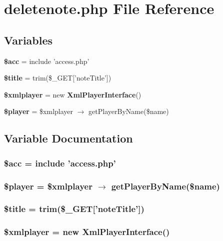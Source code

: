 \section{deletenote.php File Reference}
\label{deletenote_8php}


\subsection*{Variables}
\begin{CompactItemize}
\item 
{\bf \$acc} = include 'access.php'
\item 
{\bf \$title} = trim(\$\_\-GET['note\-Title'])
\item 
{\bf \$xmlplayer} = new {\bf Xml\-Player\-Interface}()
\item 
{\bf \$player} = \$xmlplayer $\rightarrow$ get\-Player\-By\-Name(\$name)
\end{CompactItemize}


\subsection{Variable Documentation}
\subsubsection{\setlength{\rightskip}{0pt plus 5cm}\$acc = include 'access.php'}\label{deletenote_8php_542926c588a05eb69553d79c83cf73da}


\subsubsection{\setlength{\rightskip}{0pt plus 5cm}\$player = \$xmlplayer $\rightarrow$ get\-Player\-By\-Name(\$name)}\label{deletenote_8php_b3e8b8a040d140eeafa4907e25af9360}


\subsubsection{\setlength{\rightskip}{0pt plus 5cm}\$title = trim(\$\_\-GET['note\-Title'])}\label{deletenote_8php_da57e7bb7c152edad18fe2f166188691}


\subsubsection{\setlength{\rightskip}{0pt plus 5cm}\$xmlplayer = new {\bf Xml\-Player\-Interface}()}\label{deletenote_8php_84a5cd74f81647949339a8f179d5d7b1}


